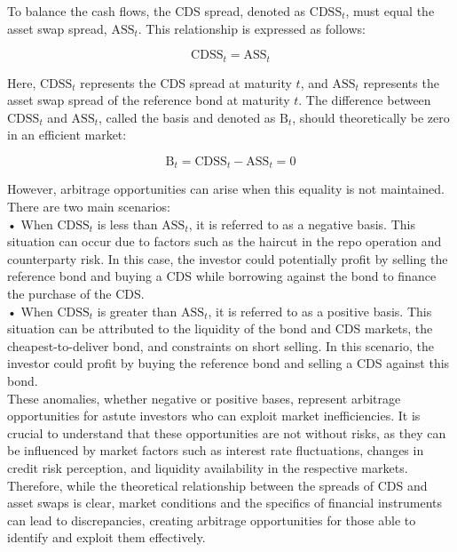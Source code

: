 \documentclass[a4paper,10pt]{article}
\begin{document}
\noindent To balance the cash flows, the CDS spread, denoted as \( \text{CDSS}_t \), must equal the asset swap spread, \( \text{ASS}_t \). This relationship is expressed as follows:

\[\text{CDSS}_t = \text{ASS}_t\]

\noindent Here, \( \text{CDSS}_t \) represents the CDS spread at maturity \( t \), and \( \text{ASS}_t \) represents the asset swap spread of the reference bond at maturity \( t \). The difference between \( \text{CDSS}_t \) and \( \text{ASS}_t \), called the basis and denoted as \( \text{B}_t \), should theoretically be zero in an efficient market:

\[\text{B}_t = \text{CDSS}_t - \text{ASS}_t = 0\]

\noindent However, arbitrage opportunities can arise when this equality is not maintained. There are two main scenarios:\\

\newline\noindent •\hspace{1em} When \( \text{CDSS}_t \) is less than \( \text{ASS}_t \), it is referred to as a negative basis. This situation can occur due to factors such as the haircut in the repo operation and counterparty risk. In this case, the investor could potentially profit by selling the reference bond and buying a CDS while borrowing against the bond to finance the purchase of the CDS.\\

\newline\noindent •\hspace{1em} When \( \text{CDSS}_t \) is greater than \( \text{ASS}_t \), it is referred to as a positive basis. This situation can be attributed to the liquidity of the bond and CDS markets, the cheapest-to-deliver bond, and constraints on short selling. In this scenario, the investor could profit by buying the reference bond and selling a CDS against this bond.\\

\noindent These anomalies, whether negative or positive bases, represent arbitrage opportunities for astute investors who can exploit market inefficiencies. It is crucial to understand that these opportunities are not without risks, as they can be influenced by market factors such as interest rate fluctuations, changes in credit risk perception, and liquidity availability in the respective markets.\\

\noindent Therefore, while the theoretical relationship between the spreads of CDS and asset swaps is clear, market conditions and the specifics of financial instruments can lead to discrepancies, creating arbitrage opportunities for those able to identify and exploit them effectively.
\end{document}
